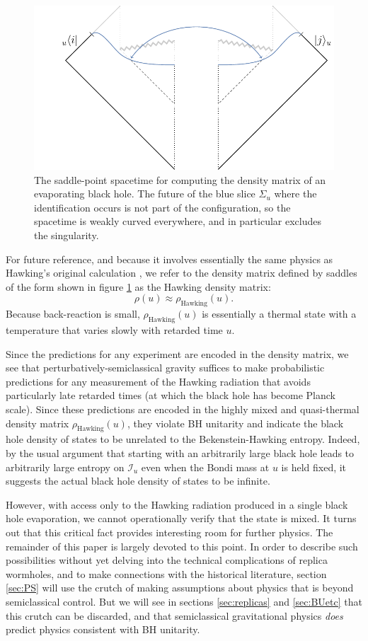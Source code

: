 \documentclass[letterpaper,12pt]{article}
\newcommand*{\scri}{\mathscr{I}} %
\begin{document}
%
\begin{figure}
\centering
	\includegraphics[width=.5\textwidth]{PSrho.pdf}
\caption{The saddle-point spacetime for computing the density matrix of an evaporating black hole. The future of the blue slice $\Sigma_u$ where the identification occurs is not part of the configuration, so the spacetime is weakly curved everywhere, and in particular excludes the singularity.\label{fig:rhoEvaporatingSC}}
\end{figure}
%

For future reference, and because it involves essentially the same physics as Hawking's original calculation \cite{Hawking:1974sw}, we refer to the density matrix defined by saddles of the form shown in figure \ref{fig:rhoEvaporatingSC} as the Hawking density matrix:
\begin{equation}\label{eq:rhoHawking}
	\rho(u) \approx \rho_\text{Hawking}(u).
\end{equation}
Because back-reaction is small, $\rho_\text{Hawking}(u)$ is essentially a thermal state with a temperature that varies slowly with retarded time $u$.

Since the predictions for any experiment are encoded in the density matrix, we see that  perturbatively-semiclassical gravity suffices to make probabilistic predictions for any measurement of the Hawking radiation that avoids particularly late retarded times (at which the black hole has become Planck scale). Since these predictions are encoded in the highly mixed and quasi-thermal density matrix $\rho_\text{Hawking}(u)$, they violate BH unitarity and indicate the black hole density of states to be unrelated to the Bekenstein-Hawking entropy.  Indeed, by the usual argument that starting with an arbitrarily large black hole leads to arbitrarily large entropy on $\scri_u$
even when the Bondi mass at $u$ is held fixed, it suggests the actual black hole density of states to be infinite.

However, with access only to the Hawking radiation produced in a single black hole evaporation, we cannot operationally verify that the state is mixed. It turns out that this critical fact provides interesting room for further physics.  The remainder of this paper is largely devoted to this point.  In order to describe such possibilities without yet delving into the technical complications of replica wormholes, and to make connections with the historical literature, section \ref{sec:PS} will use the crutch of making assumptions about physics that is beyond semiclassical control.  But we will see in sections \ref{sec:replicas} and \ref{sec:BUetc} that this crutch can be discarded, and that semiclassical gravitational physics {\it does} predict physics consistent with BH unitarity.
\end{document}
